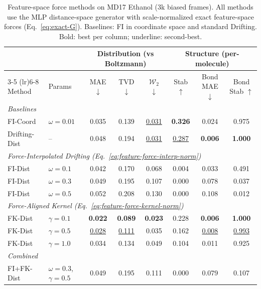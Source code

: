 \documentclass[11pt]{article}
\begin{document}
\begin{table}[t]
\centering
\caption{Feature-space force methods on MD17 Ethanol (3k biased frames). All methods use the MLP distance-space generator with scale-normalized exact feature-space forces (Eq.~\ref{eq:exact-G}). Baselines: FI in coordinate space and standard Drifting. Bold: best per column; underline: second-best.}
\label{tab:feature-space-results}
\footnotesize
\setlength{\tabcolsep}{3.5pt}  %
\begin{tabular}{@{}llcccccc@{}}
\toprule
& & \multicolumn{3}{c}{Distribution (vs Boltzmann)} & \multicolumn{3}{c}{Structure (per-molecule)} \\
\cmidrule(lr){3-5} \cmidrule(lr){6-8}
Method & Params & MAE $\downarrow$ & TVD $\downarrow$ & $\mathcal{W}_2$ $\downarrow$ & Stab $\uparrow$ & Bond MAE $\downarrow$ & Bond Stab $\uparrow$ \\
\midrule
\multicolumn{8}{l}{\textit{Baselines}} \\
FI-Coord & $\omega{=}0.01$ & 0.035 & 0.139 & \underline{0.031} & \textbf{0.326} & 0.024 & 0.975 \\
Drifting-Dist & -- & 0.048 & 0.194 & \underline{0.031} & \underline{0.287} & \textbf{0.006} & \textbf{1.000} \\
\midrule
\multicolumn{8}{l}{\textit{Force-Interpolated Drifting (Eq.~\ref{eq:feature-force-interp-norm})}} \\
FI-Dist & $\omega{=}0.1$ & 0.042 & 0.170 & 0.068 & 0.004 & 0.033 & 0.491 \\
FI-Dist & $\omega{=}0.3$ & 0.049 & 0.195 & 0.107 & 0.000 & 0.078 & 0.037 \\
FI-Dist & $\omega{=}0.5$ & 0.052 & 0.208 & 0.130 & 0.000 & 0.108 & 0.012 \\
\midrule
\multicolumn{8}{l}{\textit{Force-Aligned Kernel (Eq.~\ref{eq:feature-force-kernel-norm})}} \\
FK-Dist & $\gamma{=}0.1$ & \textbf{0.022} & \textbf{0.089} & \textbf{0.023} & 0.228 & \textbf{0.006} & \textbf{1.000} \\
FK-Dist & $\gamma{=}0.5$ & \underline{0.028} & \underline{0.111} & 0.035 & 0.162 & \underline{0.008} & \underline{0.993} \\
FK-Dist & $\gamma{=}1.0$ & 0.034 & 0.134 & 0.049 & 0.104 & 0.011 & 0.925 \\
\midrule
\multicolumn{8}{l}{\textit{Combined}} \\
FI+FK-Dist & $\omega{=}0.3$, $\gamma{=}0.5$ & 0.049 & 0.195 & 0.111 & 0.000 & 0.079 & 0.107 \\
\bottomrule
\end{tabular}
\end{table}
\end{document}
